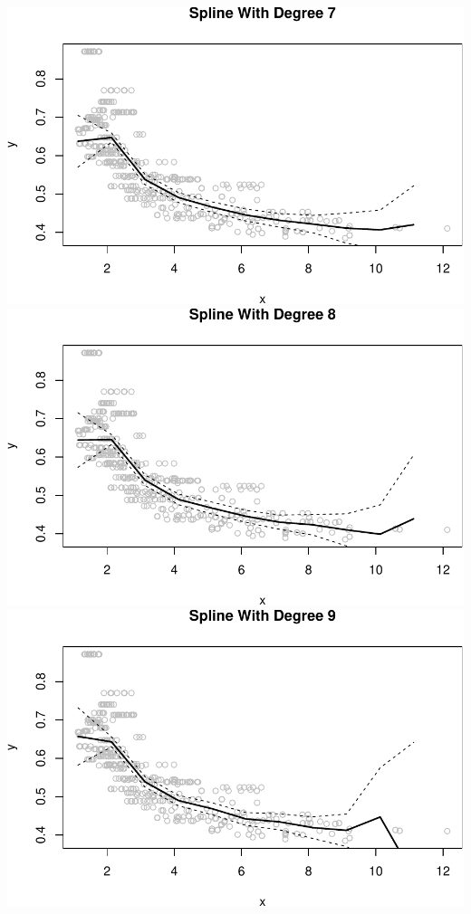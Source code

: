 \documentclass[]{article}
\begin{document}
\includegraphics{hw7_files/figure-latex/unnamed-chunk-10-7.pdf}
\includegraphics{hw7_files/figure-latex/unnamed-chunk-10-8.pdf}
\includegraphics{hw7_files/figure-latex/unnamed-chunk-10-9.pdf}
\end{document}

